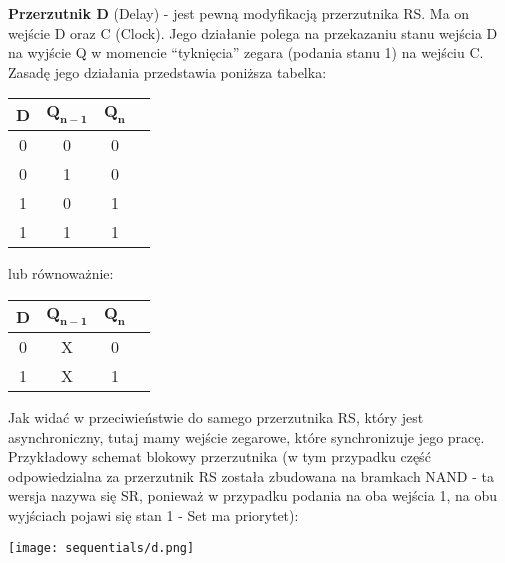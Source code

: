 \documentclass[main.tex]{subfiles}
\begin{document}
    \begin{definition}
        \textbf{Przerzutnik D} (Delay) - jest pewną modyfikacją przerzutnika RS. Ma on wejście D oraz C (Clock). Jego działanie polega na przekazaniu stanu wejścia D na wyjście Q w momencie ``tyknięcia'' zegara
        (podania stanu 1) na wejściu C.
        Zasadę jego działania przedstawia poniższa tabelka:
        \begin{table}[H]
            \center
            \begin{tabular}{|c|c|c|c|}
                \hline
                \textbf{D} & $\mathbf{Q_{n-1}}$ & $\mathbf{Q_n}$ \\ \hline
                0 & 0 & 0              \\ \hline
                0 & 1 & 0              \\ \hline
                1 & 0 & 1              \\ \hline
                1 & 1 & 1              \\ \hline
            \end{tabular}
        \end{table}

        lub równoważnie:

        \begin{table}[H]
            \center
            \begin{tabular}{|c|c|c|c|}
                \hline
                \textbf{D} & $\mathbf{Q_{n-1}}$ & $\mathbf{Q_n}$ \\ \hline
                0 & X & 0              \\ \hline
                1 & X & 1              \\ \hline
            \end{tabular}
        \end{table}

        Jak widać w przeciwieństwie do samego przerzutnika RS, który jest asynchroniczny, tutaj mamy wejście zegarowe, które synchronizuje jego pracę. \\
        \noindent Przykładowy schemat blokowy przerzutnika (w tym przypadku część odpowiedzialna za przerzutnik RS została zbudowana na bramkach NAND - ta wersja nazywa się SR,
        ponieważ w przypadku podania na oba wejścia 1, na obu wyjściach pojawi się stan 1 - Set ma priorytet): \\

        \begin{center}
            \texttt{[image: sequentials/d.png]}
        \end{center}

    \end{definition}
\end{document}
